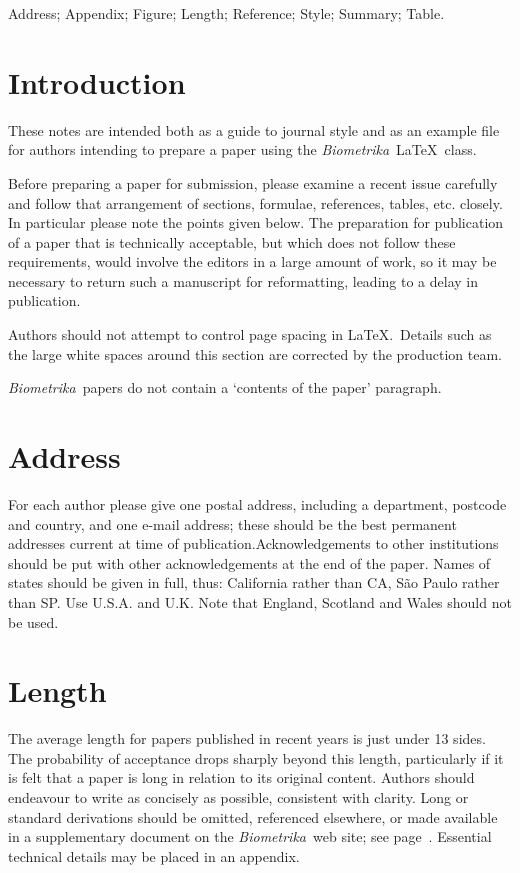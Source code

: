 \documentclass[article,lineno]{biometrika}
\def\Bka{{\it Biometrika}}
\begin{document}
\begin{keywords}
Address; Appendix; Figure; Length; Reference; Style; Summary; Table.
\end{keywords}

\section{Introduction}

These notes are intended both as a guide to journal style and as an example file for authors intending to prepare a paper using  the \Bka\ \LaTeX\ class.

Before preparing a paper for submission, please examine a recent issue carefully and follow that arrangement of sections, formulae, references, tables, etc. closely. In particular please note the points given below. The preparation for publication of a paper that is technically acceptable, but which does not follow these requirements, would involve the editors in a large amount of work, so it may be necessary to return such a manuscript for reformatting, leading to a delay in publication.

Authors should not attempt to control page spacing in \LaTeX.\  Details such as the large white spaces around this section are corrected by the production team.

\Bka\  papers do not contain a `contents of the paper' paragraph.

\section{Address}

For each author please give one postal address, including a department, postcode and country, and one e-mail address; these should be the best permanent addresses current at time of publication.\break Acknowledgements to other institutions should be put with other acknowledgements at the end of the paper. Names of states should be given in full, thus: California rather than CA, S\~ao Paulo rather than SP. Use U.S.A. and U.K. Note that England, Scotland and Wales should not be used.

\section{Length}

The average length for papers published in recent years is just under 13 sides.  The probability of acceptance drops sharply beyond this length, particularly if it is felt that a paper is long in relation to its original content.  Authors should endeavour to write as concisely as possible,  consistent with clarity.  Long or standard derivations should be omitted, referenced elsewhere, or made available in a supplementary document on the \Bka\ web site; see page~\pageref{SM}.  Essential technical details may be placed in an appendix.
\end{document}
